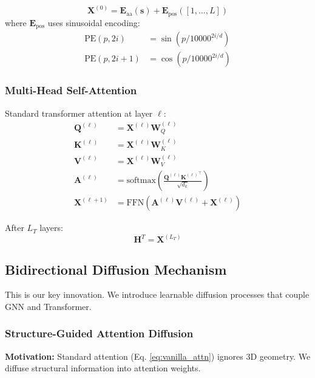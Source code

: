 \documentclass[12pt,en]{elegantpaper}
\begin{document}
\begin{equation}
    \mathbf{X}^{(0)} = \mathbf{E}_{\text{aa}}(\mathbf{s}) + \mathbf{E}_{\text{pos}}([1, \ldots, L])
\end{equation}
where $\mathbf{E}_{\text{pos}}$ uses sinusoidal encoding:
\begin{align}
    \text{PE}(p, 2i) &= \sin(p / 10000^{2i/d}) \\
    \text{PE}(p, 2i+1) &= \cos(p / 10000^{2i/d})
\end{align}

\subsubsection{Multi-Head Self-Attention}

Standard transformer attention at layer $\ell$:
\begin{align}
    \mathbf{Q}^{(\ell)} &= \mathbf{X}^{(\ell)} \mathbf{W}_Q^{(\ell)} \\
    \mathbf{K}^{(\ell)} &= \mathbf{X}^{(\ell)} \mathbf{W}_K^{(\ell)} \\
    \mathbf{V}^{(\ell)} &= \mathbf{X}^{(\ell)} \mathbf{W}_V^{(\ell)} \\
    \mathbf{A}^{(\ell)} &= \text{softmax}\left(\frac{\mathbf{Q}^{(\ell)} {\mathbf{K}^{(\ell)}}^\top}{\sqrt{d_k}}\right) \label{eq:vanilla_attn} \\
    \mathbf{X}^{(\ell+1)} &= \text{FFN}(\mathbf{A}^{(\ell)} \mathbf{V}^{(\ell)} + \mathbf{X}^{(\ell)})
\end{align}

After $L_T$ layers:
\begin{equation}
    \mathbf{H}^T = \mathbf{X}^{(L_T)}
\end{equation}

\subsection{Bidirectional Diffusion Mechanism}
\label{sec:diffusion}

This is our key innovation. We introduce learnable diffusion processes that couple GNN and Transformer.

\subsubsection{Structure-Guided Attention Diffusion}

\textbf{Motivation:} Standard attention (Eq. \ref{eq:vanilla_attn}) ignores 3D geometry. We diffuse structural information into attention weights.
\end{document}
